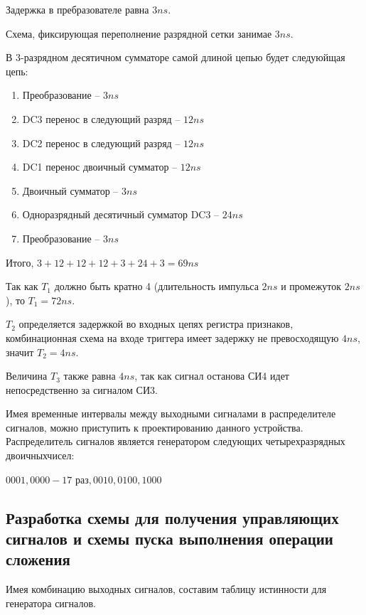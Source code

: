\documentclass[a4paper,14pt]{article}
\begin{document}
Задержка в пребразователе равна $3ns$.

Схема, фиксирующая переполнение разрядной сетки занимае  $3ns$.

В 3-разрядном десятичном сумматоре самой длиной цепью будет следуюйщая цепь:
\begin{enumerate}
	\item Преобразование -- $3ns$
	\item DC3 перенос в следующий разряд -- $12ns$
	\item DC2 перенос в следующий разряд -- $12ns$
	\item DC1 перенос двоичный сумматор -- $12ns$
	\item Двоичный сумматор -- $3ns$
	\item Одноразрядный десятичный сумматор DC3 -- $24ns$
	\item Преобразование -- $3ns$
\end{enumerate}

Итого, $3 + 12 + 12 + 12 + 3 + 24 + 3 = 69ns$

Так как $T_1$ должно быть кратно 4 (длительность  импульса $2ns$ и промежуток $2ns$), то $T_1 = 72ns$.

$T_2$ определяется задержкой во входных цепях регистра признаков, комбинационная схема на входе триггера имеет задержку не превосходящую $4ns$, значит $T_2 = 4ns$.

Величина $T_3$ также равна $4ns$, так как сигнал останова СИ4 идет непосредственно за сигналом СИ3.

Имея временные интервалы между выходными сигналами в распределителе сигналов, можно приступить к проектированию данного устройства.
Распределитель сигналов является генератором следующих четырехразрядных двоичныхчисел:

$0001,0000 - 17$ раз$, 0010, 0100, 1000$

\subsection{Разработка схемы для получения управляющих сигналов и схемы пуска выполнения операции сложения}

Имея комбинацию выходных сигналов, составим таблицу истинности для генератора сигналов.
\end{document}
